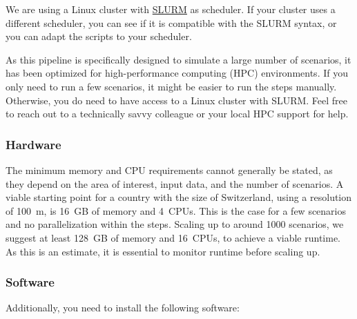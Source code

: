 \documentclass[
  letterpaper,
  DIV=11,
  numbers=noendperiod]{scrreprt}
\newcounter{quartocalloutcauno}
\newcommand{\quartocalloutcau}[1]{\refstepcounter{quartocalloutcauno}\label{#1}}
\begin{document}
We are using a Linux cluster with
\href{https://slurm.schedmd.com/overview.html}{SLURM} as scheduler. If
your cluster uses a different scheduler, you can see if it is compatible
with the SLURM syntax, or you can adapt the scripts to your scheduler.

\begin{tcolorbox}[enhanced jigsaw, breakable, bottomrule=.15mm, toprule=.15mm, rightrule=.15mm, opacitybacktitle=0.6, title=\textcolor{quarto-callout-note-color}{\faInfo}\hspace{0.5em}{Note \ref*{cau-linux-cluster}: What is a Linux cluster?}, coltitle=black, colback=white, titlerule=0mm, toptitle=1mm, left=2mm, bottomtitle=1mm, colbacktitle=quarto-callout-note-color!10!white, colframe=quarto-callout-note-color-frame, opacityback=0, leftrule=.75mm, arc=.35mm]

\quartocalloutcau{cau-linux-cluster} 

As this pipeline is specifically designed to simulate a large number of
scenarios, it has been optimized for high-performance computing (HPC)
environments. If you only need to run a few scenarios, it might be
easier to run the steps manually. Otherwise, you do need to have access
to a Linux cluster with SLURM. Feel free to reach out to a technically
savvy colleague or your local HPC support for help.

\end{tcolorbox}

\subsubsection{Hardware}\label{hardware}

The minimum memory and CPU requirements cannot generally be stated, as
they depend on the area of interest, input data, and the number of
scenarios. A viable starting point for a country with the size of
Switzerland, using a resolution of 100~m, is 16~GB of memory and 4~CPUs.
This is the case for a few scenarios and no parallelization within the
steps. Scaling up to around 1000 scenarios, we suggest at least 128~GB
of memory and 16~CPUs, to achieve a viable runtime. As this is an
estimate, it is essential to monitor runtime before scaling up.

\subsubsection{Software}\label{software}

Additionally, you need to install the following software:
\end{document}
